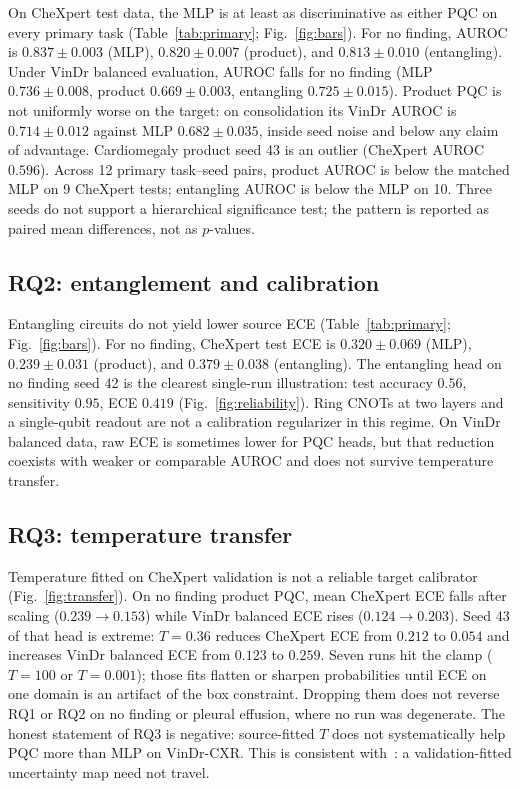 \documentclass[11pt,a4paper]{article}
\begin{document}
On CheXpert test data, the MLP is at least as discriminative as either PQC on every primary task (Table~\ref{tab:primary}; Fig.~\ref{fig:bars}). For no finding, AUROC is $0.837\pm 0.003$ (MLP), $0.820\pm 0.007$ (product), and $0.813\pm 0.010$ (entangling). Under VinDr balanced evaluation, AUROC falls for no finding (MLP $0.736\pm 0.008$, product $0.669\pm 0.003$, entangling $0.725\pm 0.015$). Product PQC is not uniformly worse on the target: on consolidation its VinDr AUROC is $0.714\pm 0.012$ against MLP $0.682\pm 0.035$, inside seed noise and below any claim of advantage. Cardiomegaly product seed 43 is an outlier (CheXpert AUROC $0.596$). Across 12 primary task--seed pairs, product AUROC is below the matched MLP on 9 CheXpert tests; entangling AUROC is below the MLP on 10. Three seeds do not support a hierarchical significance test; the pattern is reported as paired mean differences, not as $p$-values.

\subsection{RQ2: entanglement and calibration}

Entangling circuits do not yield lower source ECE (Table~\ref{tab:primary}; Fig.~\ref{fig:bars}). For no finding, CheXpert test ECE is $0.320\pm 0.069$ (MLP), $0.239\pm 0.031$ (product), and $0.379\pm 0.038$ (entangling). The entangling head on no finding seed 42 is the clearest single-run illustration: test accuracy $0.56$, sensitivity $0.95$, ECE $0.419$ (Fig.~\ref{fig:reliability}). Ring CNOTs at two layers and a single-qubit readout are not a calibration regularizer in this regime. On VinDr balanced data, raw ECE is sometimes lower for PQC heads, but that reduction coexists with weaker or comparable AUROC and does not survive temperature transfer.

\subsection{RQ3: temperature transfer}

Temperature fitted on CheXpert validation is not a reliable target calibrator (Fig.~\ref{fig:transfer}). On no finding product PQC, mean CheXpert ECE falls after scaling ($0.239\to 0.153$) while VinDr balanced ECE rises ($0.124\to 0.203$). Seed 43 of that head is extreme: $T=0.36$ reduces CheXpert ECE from $0.212$ to $0.054$ and increases VinDr balanced ECE from $0.123$ to $0.259$. Seven runs hit the clamp ($T=100$ or $T=0.001$); those fits flatten or sharpen probabilities until ECE on one domain is an artifact of the box constraint. Dropping them does not reverse RQ1 or RQ2 on no finding or pleural effusion, where no run was degenerate. The honest statement of RQ3 is negative: source-fitted $T$ does not systematically help PQC more than MLP on VinDr-CXR. This is consistent with~\citet{ovadia2019shift}: a validation-fitted uncertainty map need not travel.
\end{document}
